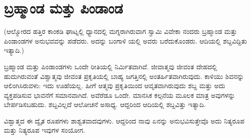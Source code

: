 
\chapter{ಬ್ರಹ್ಮಾಂಡ ಮತ್ತು ಪಿಂಡಾಂಡ}

(ಆಲ್ಮೋರದ ಹತ್ತಿರ ಕಾಂಕಡಿ ಘಾಟ್ನಲ್ಲಿ ಧ್ಯಾನದಲ್ಲಿ ಮಗ್ನರಾಗಿರುವಾಗ ಸ್ವಾಮಿ ವಿವೇಕಾ ನಂದರು ಬ್ರಹ್ಮಾಂಡ ಮತ್ತು ಪಿಂಡಾಂಡಗಳ ಅನುಭವವನ್ನು ಪಡೆದರು. ಅದನ್ನು ಬಂಗಾಳಿ ಯಲ್ಲಿ ಅವರು ಬರೆದುಕೊಂಡರು. ಆದಿಯಲ್ಲಿ ಶಬ್ದವಿದ್ದಿತು ಇತ್ಯಾದಿ.)

ಬ್ರಹ್ಮಾಂಡ ಮತ್ತು ಪಿಂಡಾಂಡಗಳು ಒಂದೇ ರೀತಿಯಲ್ಲಿ ನಿರ್ಮಿತವಾಗಿವೆ. ಜೀವಾತ್ಮವು ಜೀವಂತ ದೇಹದಲ್ಲಿ ಹುದುಗಿರುವಂತೆ ವಿಶ್ವಾತ್ಮವು ಜೀವಂತ ಪ್ರಕೃತಿಯಲ್ಲಿ ಬಾಹ್ಯ ಜಗತ್ತಿನಲ್ಲಿ ಅಂತರ್ಹಿತವಾಗಿರುವುದು. ಕಾಳಿಯು ಶಿವನನ್ನು ಆಲಿಂಗಿಸಿರುವಳು: ಇದು ಊಹೆಯಲ್ಲ. ಹೀಗೆ ಆತ್ಮವು ಪ್ರಕೃತಿಯಿಂದ ಆವೃತವಾಗಿರುವುದು ಶಬ್ದ ಮತ್ತು ಅದು ವ್ಯಕ್ತಪಡಿಸುವ ಭಾವನೆಗೆ ಸಮಾನವಾಗಿದೆ. ಅವೆರೆಡೂ ಒಂದೇ. ಮಾನಸಿಕ ಕಲ್ಪನೆಯ ಮೂಲಕ ಮಾತ್ರ ಅವುಗಳನ್ನು ಬೇರ್ಪಡಿಸಬಹುದು. ಶಬ್ದವಿಲ್ಲದೆ ಆಲೋಚನೆ ಅಸಾಧ್ಯ. ಆದ್ದರಿಂದ ಆದಿಯಲ್ಲಿ ಶಬ್ದವಿತ್ತು ಇತ್ಯಾದಿ.

ವಿಶ್ವಾತ್ಮದ ಈ ದ್ವೈತ ರೂಪಗಳು ಶಾಶ್ವತವಾದವುಗಳು. ಆದ್ದರಿಂದ ನಾವು ಏನನ್ನು ಅನುಭವಿಸುತ್ತೇವೊ ಅದು ನಿತ್ಯರೂಪ ಮತ್ತು ನಿತ್ಯರೂಪ ಇವುಗಳ ಸಂಯೋಗ.

